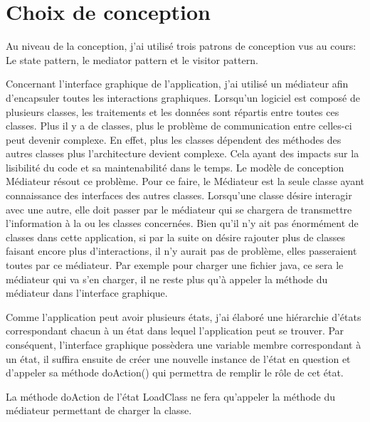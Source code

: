 \documentclass[a4paper, 11pt]{article}
\begin{document}
\section{Choix de conception}
	Au niveau de la conception, j'ai utilisé trois patrons de conception vus au cours: Le state pattern, le mediator pattern et le visitor pattern.
	
	Concernant l'interface graphique de l'application, j'ai utilisé un médiateur afin d'encapsuler toutes les interactions graphiques. Lorsqu'un logiciel est composé de plusieurs classes, les traitements et les données sont répartis entre toutes ces classes. Plus il y a de classes, plus le problème de communication entre celles-ci peut devenir complexe. En effet, plus les classes dépendent des méthodes des autres classes plus l'architecture devient complexe. Cela ayant des impacts sur la lisibilité du code et sa maintenabilité dans le temps. Le modèle de conception Médiateur résout ce problème. Pour ce faire, le Médiateur est la seule classe ayant connaissance des interfaces des autres classes. Lorsqu'une classe désire interagir avec une autre, elle doit passer par le médiateur qui se chargera de transmettre l'information à la ou les classes concernées. Bien qu'il n'y ait pas énormément de classes dans cette application, si par la suite on désire rajouter plus de classes faisant encore plus d'interactions, il n'y aurait pas de problème, elles passeraient toutes par ce médiateur. Par exemple pour charger une fichier java, ce sera le médiateur qui va s'en charger, il ne reste plus qu'à appeler la méthode du médiateur dans l'interface graphique.
	
	
	
	Comme l'application peut avoir plusieurs états, j'ai élaboré une hiérarchie d'états correspondant chacun à un état dans lequel l'application peut se trouver. Par conséquent, l'interface graphique possèdera une variable membre correspondant à un état, il suffira ensuite de créer une nouvelle instance de l'état en question et d'appeler sa méthode doAction() qui permettra de remplir le rôle de cet état.
	
	
	
	La méthode doAction de l'état LoadClass ne fera qu'appeler la méthode du médiateur permettant de charger la classe.
	
	
	
\end{document}

